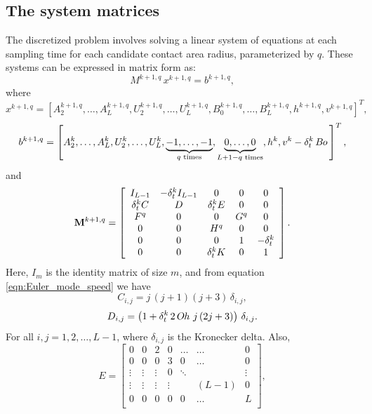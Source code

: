 \documentclass{jfm}
\newcommand{\Bo}{B\kern-0.05em o\,}
\newcommand{\Oh}{O\kern-0.05em h\,}
\begin{document}
\subsection{The system matrices} \label{subsubsec:thesystemmatrices}


The discretized problem involves solving a linear system of equations at each sampling time for each candidate contact area radius, parameterized by $q$. These systems can be expressed in matrix form as:
\begin{equation}\label{eqn:Sys_eqn_k+1_q}
M^{k+1,q} \, x^{k+1,q} = b^{k+1,q},
\end{equation}
where
\begin{equation}
x^{k+1,q}
=
\left[ A_2^{k+1,q},
       \ldots,
       A_L^{k+1,q},
       U_2^{k+1,q},
       \ldots,
       U_L^{k+1,q},
       B_0^{k+1,q},
       \ldots,
       B_L^{k+1,q},
       h^{k+1,q},
       v^{k+1,q}
\right]^T ,
\end{equation}
\begin{equation}
    b^{k+1,q} = \left[A_2^k,\ldots,A_L^k,U_2^k,\ldots,U_L^k,\underbrace{-1,\ldots,-1}_{q \text{ times}},\underbrace{0,\ldots,0}_{L+1-q \text{ times}},h^k,v^k-\delta_t^{k} \, \Bo \right]^T,
\end{equation}
and
\begin{equation}
    {\bf M}^{k+1,q} =
    \left[
    \begin{array}{ccccc}
        I_{L-1} & -\delta_t^kI_{L-1} & 0& 0 & 0 \\
        \delta_t^k C & D & \delta_t^k E & 0 & 0 \\
        F^q & 0 & 0 & G^q & 0 \\
        0 & 0 & H^q & 0 & 0 \\
        0 & 0 & 0 & 1 & -\delta_t^k \\
        0 & 0 & \delta_t^k K & 0 & 1
    \end{array}
    \right].
\end{equation}
Here, $I_{m}$ is the identity matrix of size $m$, and from equation \eqref{eqn:Euler_mode_speed} we have
\begin{equation}
    C_{i,j} = j \, (j+1)(j+3) \, \delta_{i,j},
\end{equation}
\begin{equation}
    D_{i,j} = \left(1 +  \delta^k_t \, 2 \, \Oh \,j \, (2j+3)\right) \, \delta_{i,j}.
\end{equation}
For all $i, j = 1, 2, \dots, L-1$, where $\delta_{i, j}$ is the Kronecker delta. Also, 
\begin{equation}
    E = \left[
    \begin{array}{cc|ccccc}
       0      & 0      &  2      & 0      &\ldots &\ldots    &0\\
       0      & 0      &  0      & 3      &0      &\ldots    &0\\
       \vdots & \vdots &  \vdots & 0      &\ddots &          &\vdots\\
       \vdots & \vdots &  \vdots & \vdots &       &(L-1)     &0\\
       0      & 0      &  0      & 0      &0      &\ldots    &L\\
    \end{array}
    \right],
\end{equation}
\end{document}
